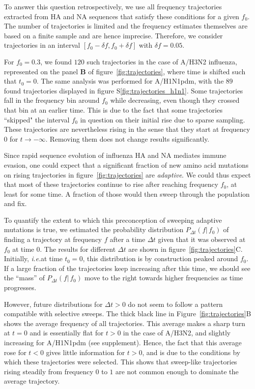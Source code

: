 \documentclass[reprint,amsmath,amssymb,superscriptaddress,showpacs,rmp]{revtex4-1}
\newcommand{\sref}[1]{S\ref{#1}}
\providecommand{\DIFadd}[1]{{\protect\color{blue}\uwave{#1}}} %
\providecommand{\DIFaddbegin}{} %
\providecommand{\DIFaddend}{} %
\newcommand{\DIFaddincludegraphics}[2][]{{\color{blue}\fbox{\DIFOincludegraphics[#1]{#2}}}} %
\DeclareRobustCommand{\DIFaddbegin}{\DIFOaddbegin \let\includegraphics\DIFaddincludegraphics} %
\DeclareRobustCommand{\DIFaddend}{\DIFOaddend \let\includegraphics\DIFOincludegraphics} %
\begin{document}
To answer this question retrospectively, we use all frequency trajectories extracted from HA and NA sequences that satisfy these conditions for a given $f_0$.  The number of trajectories is limited and the frequency estimates themselves are based on a finite sample and are hence imprecise.
Therefore, we consider trajectories in an interval $[f_0-\delta f, f_0+\delta f]$ with $\delta f = 0.05$.

For $f_0=0.3$, we found $120$ such trajectories in the case of A/H3N2 influenza, represented on the panel \textbf{B} of figure~\ref{fig:trajectories}, where time is shifted such that $t_0 = 0$. The same analysis was performed for A/H1N1pdm, with the $89$ found trajectories displayed in figure \sref{fig:trajectories_h1n1}.
Some trajectories fall in the frequency bin around $f_0$ while decreasing, even though they crossed that bin at an earlier time.
This is due to the fact that some trajectories ``skipped" the interval $f_0$ in question on their initial rise due to sparse sampling.
These trajectories are nevertheless rising in the sense that they start at frequency 0 for $t\rightarrow -\infty$.
Removing them does not change results significantly.

Since rapid sequence evolution of influenza HA and NA mediates immune evasion, one could expect that a significant fraction of new amino acid mutations on rising trajectories in figure~\ref{fig:trajectories} are \emph{adaptive}.
We could thus expect that most of these trajectories continue to rise after reaching frequency $f_0$, at least for some time.
A fraction of those would then sweep through the population and fix.

To quantify the extent to which this preconception of sweeping adaptive mutations is true, we estimated the probability distribution $P_{\Delta t}(f\vert\,f_0)$ of finding a trajectory at frequency $f$ after a time $\Delta t$ given that it was observed at $f_0$ at time $0$.
The results for different $\Delta t$ are shown in figure~\ref{fig:trajectories}C.
Initially, \emph{i.e.}\DIFaddbegin \DIFadd{, }\DIFaddend at time $t_0=0$, this distribution is by construction peaked around $f_0$.
If a large fraction of the trajectories keep increasing after  this time, we should see the ``mass'' of $P_{\Delta t}(f\vert\,f_0)$ move to the right towards higher frequencies as time progresses.

However, future distributions for $\Delta t >0$ do not seem to follow a pattern compatible with selective sweeps.
The thick black line in Figure~\ref{fig:trajectories}B shows the average frequency of all trajectories.
This average makes a sharp turn at $t=0$ and is essentially flat for $t>0$ in the case of A/H3N2, and slightly increasing for A/H1N1pdm (see supplement).
Hence, the fact that this average rose for $t<0$ gives little information for $t>0$, and is due to the conditions by which these trajectories were selected.
This shows that sweep-like trajectories rising steadily from frequency $0$ to $1$ are not common enough to dominate the average trajectory.
\end{document}

